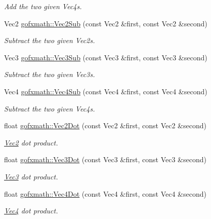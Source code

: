 \begin{DoxyCompactItemize}
\begin{DoxyCompactList}\small\item\em Add the two given Vec4s. \end{DoxyCompactList}\item 
Vec2 \hyperlink{group___s_i_s_d_vec_math_gabc910528ba2f4f4c3b69bf432e5c7731}{gofxmath\+::\+Vec2\+Sub} (const Vec2 \&first, const Vec2 \&second)
\begin{DoxyCompactList}\small\item\em Subtract the two given Vec2s. \end{DoxyCompactList}\item 
Vec3 \hyperlink{group___s_i_s_d_vec_math_gae7189108aa879fb16ce9afd17052ac16}{gofxmath\+::\+Vec3\+Sub} (const Vec3 \&first, const Vec3 \&second)
\begin{DoxyCompactList}\small\item\em Subtract the two given Vec3s. \end{DoxyCompactList}\item 
Vec4 \hyperlink{group___s_i_s_d_vec_math_ga01968b83532d01613a8f89659d4a52dc}{gofxmath\+::\+Vec4\+Sub} (const Vec4 \&first, const Vec4 \&second)
\begin{DoxyCompactList}\small\item\em Subtract the two given Vec4s. \end{DoxyCompactList}\item 
float \hyperlink{group___s_i_s_d_vec_math_gaf722c71a1e9ef7bf97d9489b1cf561e0}{gofxmath\+::\+Vec2\+Dot} (const Vec2 \&first, const Vec2 \&second)
\begin{DoxyCompactList}\small\item\em \hyperlink{classgofxmath_1_1_vec2}{Vec2} dot product. \end{DoxyCompactList}\item 
float \hyperlink{group___s_i_s_d_vec_math_ga02eb26d5238095f747d35890a597e489}{gofxmath\+::\+Vec3\+Dot} (const Vec3 \&first, const Vec3 \&second)
\begin{DoxyCompactList}\small\item\em \hyperlink{classgofxmath_1_1_vec3}{Vec3} dot product. \end{DoxyCompactList}\item 
float \hyperlink{group___s_i_s_d_vec_math_ga2deb01c8dd6f1a06c0a0cfc2e96e9c1e}{gofxmath\+::\+Vec4\+Dot} (const Vec4 \&first, const Vec4 \&second)
\begin{DoxyCompactList}\small\item\em \hyperlink{classgofxmath_1_1_vec4}{Vec4} dot product. \end{DoxyCompactList}\item 

\end{DoxyCompactItemize}
